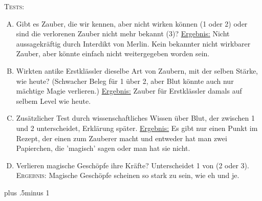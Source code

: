 \begin{centering}
\begin{samepage}
\scshape Tests:
\itshape
 \begin{enumerate}[A.]{
 \firmlist
 \setlength{\leftmargin}{\parindent}
 \setlength{\rightmargin}{1cm}}
\item Gibt es Zauber, die wir kennen, aber nicht wirken können (1 oder 2) oder sind die verlorenen Zauber nicht mehr bekannt (3)? \uline{Ergebnis:} Nicht aussagekräftig durch Interdikt von Merlin. Kein bekannter nicht wirkbarer Zauber, aber könnte einfach nicht weitergegeben worden sein.
\item Wirkten antike Erstklässler dieselbe Art von Zaubern, mit der selben Stärke, wie heute? (Schwacher Beleg für 1 über 2, aber Blut könnte auch nur mächtige Magie verlieren.) \uline{Ergebnis:} Zauber für Erstklässler damals auf selbem Level wie heute.
\item Zusätzlicher Test durch wissenschaftliches Wissen über Blut, der zwischen 1 und 2 unterscheidet, Erklärung später. \uline{Ergebnis:} Es gibt nur einen Punkt im Rezept, der einen zum Zauberer macht und entweder hat man zwei Papierchen, die 'magisch' sagen oder man hat sie nicht.
\item Verlieren magische Geschöpfe ihre Kräfte? Unterscheidet 1 von (2 oder 3). {\scshape Ergebnis:} Magische Geschöpfe scheinen so stark zu sein, wie eh und je.
 \end{enumerate}
\end{samepage}
\end{centering}
\baselineskip plus .5\textheight minus 1\baselineskip
\restoretrivseps

